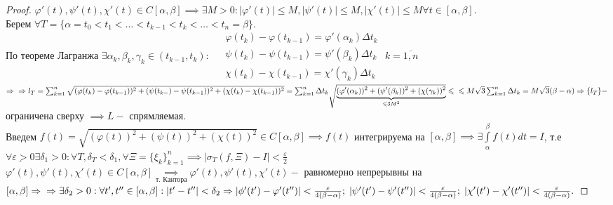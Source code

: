 \documentclass[../main.tex]{subfiles}
\begin{document}
\newpage
{}
\begin{proof}
    $\varphi'(t),\psi'(t), \chi'(t) \in C[\alpha,\beta] \implies \exists M>0: |\varphi'(t)|\leqslant M, |\psi'(t)|\leqslant M, |\chi'(t)|\leqslant M \forall t \in [\alpha,\beta].$\\ 
    Берем $\forall T=\{\alpha=t_{0}<t_{1}<\dots<t_{k-1}<t_{k}<\dots<t_{ n}=\beta\}.$ \\По теореме Лагранжа $\exists \alpha_{k},\beta_{k},\gamma_{k}\in (t_{k-1},t_{k}): $
    $\begin{aligned} &\varphi(t_{k})-\varphi(t_{k-1})=\varphi'(\alpha_{k})\Delta t_{k}\\ &\psi(t_{k})-\psi(t_{k-1})=\psi'(\beta_{k})\Delta t_{k}\\ &\chi(t_{k})-\chi(t_{k-1})=\chi'(\gamma_{k})\Delta t_{k}\end{aligned} $ $k=\overline{1,n}$
    $\implies\\\implies l_{T}=\sum_{k=1}^{n} \sqrt{(\varphi(t_{k})-\varphi(t_{k-1}))^{2}+(\psi(t_{k-})-\psi(t_{k-1}))^{2}+(\chi(t_{k})-\chi(t_{k-1}))^{2}} = \sum_{k=1}^{n    } \Delta t_{k}{\sqrt{\underbrace{{(\varphi'(\alpha_{k}))^{2}}+(\psi'(\beta_{k}))^{2}+(\chi(\gamma_{k}))^{2}}_{\leqslant 3M^{2}}}}\leqslant\\\leqslant M\sqrt{3}\sum_{k=1}^{n   } \Delta t_{k}=M \sqrt{3}(\beta-\alpha)\implies\{l_{T}\}-$ ограничена сверху $\implies L-$ спрямляемая. 
    \\ Введем $f(t)=\sqrt{(\varphi(t))^{2}+(\psi(t))^{2}+(\chi(t))^{2}}\in C[\alpha,\beta]\implies f(t) $ интегрируема на $[\alpha,\beta]\implies \exists \int\limits_{\alpha       }^{\beta} f(t)dt=I$, т.е $\underline{\forall \varepsilon>0} \exists \delta_{1}>0: \forall T, \delta_{T}<\delta_{1}, \forall \Xi=\{\xi_{k}\}_{k=1}^{n}\implies |\sigma_{T}(f,\Xi)-I| < \frac{\varepsilon}{2}$ 
    \\$\varphi'(t),\psi'(t),\chi'(t)\in C[\alpha,\beta]\underset{\text{т. Кантора}}{\implies} \varphi'(t),\psi'(t),\chi'(t) - $ равномерно непрерывны на $[\alpha,\beta]\implies \\ \implies \exists \delta_{2}>0 : \forall t',t'' \in [\alpha,\beta] : |t'-t''|<\delta_{2} \implies |\phi'(t')-\varphi'(t'')|<\frac{\varepsilon}{4(\beta-\alpha)}; \; |\psi'(t')-\psi'(t'')|<\frac{\varepsilon}{4(\beta-\alpha)}; \; |\chi'(t')-\chi'(t'')|<\frac{\varepsilon}{4(\beta-\alpha)}.$

\end{proof}
\end{document}
